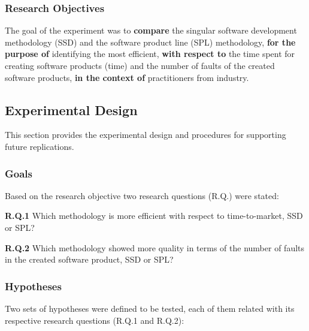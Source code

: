 \subsubsection{Research Objectives}\label{sub:object}

The goal of the experiment was to \textbf{compare} the singular software development methodology (SSD) and the software product line (SPL) methodology, \textbf{for the purpose of} identifying the most efficient, \textbf{with respect to} the time spent for creating software products (time) and the number of faults of the created software products, \textbf{in the context of} practitioners from industry.





\subsection{Experimental Design}\label{sub:design}

This section provides the experimental design and procedures for supporting future replications.


\subsubsection{Goals}

Based on the research objective two research questions (R.Q.) were stated:


\textbf{R.Q.1} Which methodology is more efficient with respect to time-to-market, SSD or SPL?

\textbf{R.Q.2} Which methodology showed more quality in terms of the number of faults in the created software product, SSD or SPL?

\subsubsection{Hypotheses}

Two sets of hypotheses were defined to be tested, each of them related with its respective research questions (R.Q.1 and R.Q.2):


